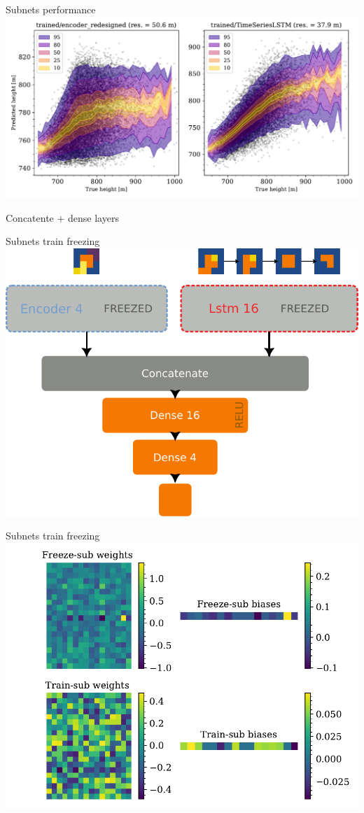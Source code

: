 \documentclass{beamer}
\begin{document}
\begin{frame}{Subnets performance}
    \includegraphics[width=\textwidth]{sub_net_train.pdf}
\end{frame}

\begin{frame}{Concatente + dense layers}

    
\end{frame}


\begin{frame}{Subnets train freezing}
    \includegraphics[width=.8\linewidth]{freezetraining_2.pdf}
\end{frame}

\begin{frame}{Subnets train freezing}
    \includegraphics[width=.8\linewidth]{freezetraining.pdf}
\end{frame}
\end{document}

